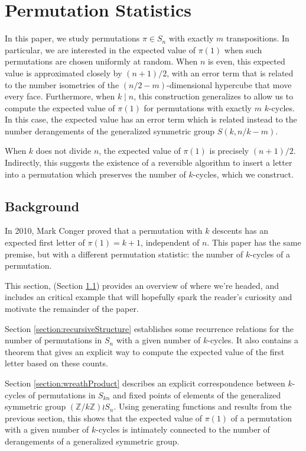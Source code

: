 \chapter{Permutation Statistics}
\label{cha:PermutationStatistics}

In this paper, we study permutations $\pi \in S_n$ with exactly $m$ transpositions.
In particular, we are interested in the expected value of $\pi(1)$ when such
permutations are chosen uniformly at random. When $n$ is even, this expected value
is approximated closely by $(n+1)/2$, with an error term that is related to the number isometries
of the $(n/2-m)$-dimensional hypercube that move every face.
Furthermore, when $k \mid n$, this construction generalizes to allow us to compute
the expected value of $\pi(1)$ for permutations
with exactly $m$ $k$-cycles. In this case, the expected value has an
error term which is related instead to the number derangements of the
generalized symmetric group $S(k,n/k-m)$.

When $k$ does not divide $n$, the expected value of $\pi(1)$ is precisely
$(n+1)/2$.
Indirectly, this suggests the existence of a reversible algorithm
to insert a letter into a permutation which preserves the number of $k$-cycles,
which we construct.

\section{Background}
\label{section:background}

In 2010, Mark Conger \cite{conger} proved that a permutation
with $k$ descents has an expected first letter of $\pi(1) = k + 1$,
independent of $n$.
This paper has the same premise, but with a different permutation statistic:
the number of $k$-cycles of a permutation.

This section, (Section \ref{section:background}) provides an overview of where
we're headed, and includes an critical example that will hopefully spark the
reader's curiosity and motivate the remainder of the paper.

Section \ref{section:recursiveStructure} establishes some recurrence relations for
the number of permutations in $S_n$ with a given number of $k$-cycles.
It also contains a theorem that gives an explicit way to compute the expected
value of the first letter based on these counts.

Section \ref{section:wreathProduct} describes an explicit correspondence
between $k$-cycles of permutations in $S_{kn}$ and fixed points of elements of the generalized
symmetric group $(\mathbb{Z}/k\mathbb{Z}) \wr S_n$. Using generating functions and results
from the previous section, this shows that the expected value of $\pi(1)$ of a
permutation with a given number of $k$-cycles is intimately connected to the
number of derangements of a generalized symmetric group.


